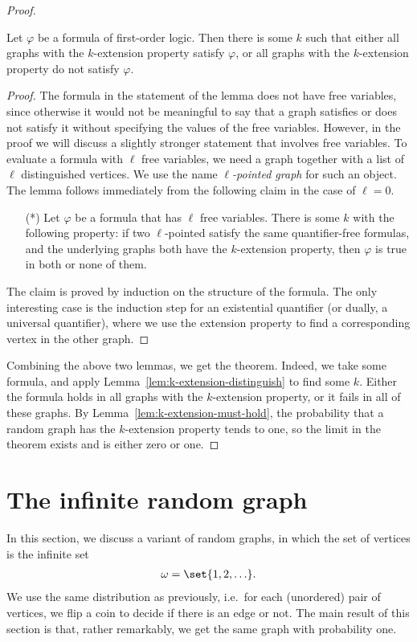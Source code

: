 \begin{proof}
\begin{lemma} \label{lem:k-extension-distinguish} Let $\varphi$ be a formula of first-order logic. Then there is some $k$ such that either all graphs with the $k$-extension property satisfy $\varphi$, or all graphs with the $k$-extension property do not satisfy $\varphi$. 
\end{lemma}
\begin{proof}
	The formula in the statement of the lemma does not have free variables, since otherwise it would not be meaningful to say that a graph satisfies or does not satisfy it without specifying the values of the free variables. However, in the proof we will discuss  a slightly stronger statement that involves free variables. To evaluate a formula with $\ell$ free variables, we need a graph together with a list of $\ell$ distinguished vertices.  We use the name \emph{$\ell$-pointed graph} for such an object. The lemma follows immediately from the following claim in the case of $\ell =0$. 
	\begin{itemize}
		\item[(*)] Let $\varphi$ be a formula that has $\ell$ free variables. There is some $k$ with the following property: if two $\ell$-pointed  satisfy the same quantifier-free formulas, and the underlying graphs both  have the $k$-extension property, then $\varphi$ is true in both or none of them.  
	\end{itemize}
	The claim is proved by induction on the structure of the formula. The only interesting case is the induction step for an existential quantifier (or dually, a universal quantifier), where we use the extension property to find a corresponding vertex in the other graph.
\end{proof}

Combining the above two lemmas, we get the  theorem. Indeed, we take some formula, and apply Lemma~\ref{lem:k-extension-distinguish} to find some $k$. Either the formula holds in all graphs with the $k$-extension property, or it fails in all of these graphs. By Lemma~\ref{lem:k-extension-must-hold}, the probability that a random graph has the $k$-extension property tends to one, so the limit in the theorem exists and is either zero or one.
\end{proof}


\section{The infinite random graph}
In this section, we discuss a variant of random graphs, in which the set of vertices is the infinite set
\begin{align*}
\omega = \set{1,2,\ldots}.
\end{align*}
We use the same distribution as previously, i.e.~for each (unordered) pair of vertices, we flip a coin to decide if there is an edge or not. The main result of this section is that, rather remarkably, we get the same graph with probability one. 

